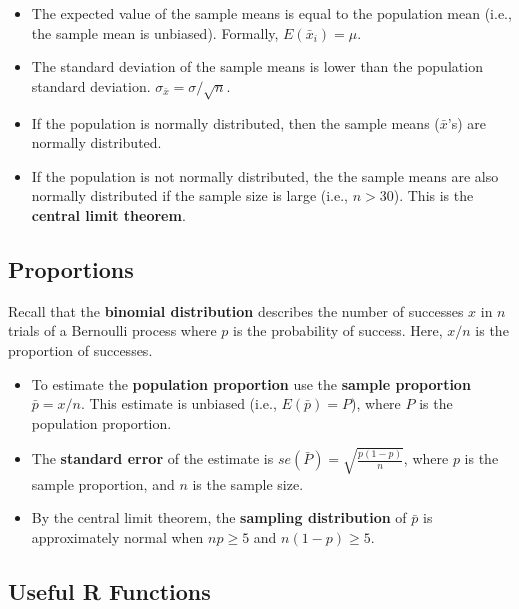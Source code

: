 \documentclass[
  letterpaper,
  DIV=11,
  numbers=noendperiod]{scrreprt}
\begin{document}
\begin{itemize}
\item
  The expected value of the sample means is equal to the population mean
  (i.e., the sample mean is unbiased). Formally, \(E(\bar x_i) = \mu\).
\item
  The standard deviation of the sample means is lower than the
  population standard deviation. \(\sigma_{\bar x}= \sigma/\sqrt{n}\).
\item
  If the population is normally distributed, then the sample means
  (\(\bar x\)'s) are normally distributed.
\item
  If the population is not normally distributed, the the sample means
  are also normally distributed if the sample size is large (i.e.,
  \(n>30\)). This is the \textbf{central limit theorem}.
\end{itemize}

\hypertarget{proportions}{%
\subsection*{Proportions}\label{proportions}}

Recall that the \textbf{binomial distribution} describes the number of
successes \(x\) in \(n\) trials of a Bernoulli process where \(p\) is
the probability of success. Here, \(x/n\) is the proportion of
successes.

\begin{itemize}
\item
  To estimate the \textbf{population proportion} use the \textbf{sample
  proportion} \(\bar p = x/n\). This estimate is unbiased (i.e.,
  \(E(\bar p)=P\)), where \(P\) is the population proportion.
\item
  The \textbf{standard error} of the estimate is
  \(se(\bar P)= \sqrt { \frac {p(1-p)}{n}}\), where \(p\) is the sample
  proportion, and \(n\) is the sample size.
\item
  By the central limit theorem, the \textbf{sampling distribution} of
  \(\bar p\) is approximately normal when \(np \geq 5\) and
  \(n(1-p)\geq 5\).
\end{itemize}

\hypertarget{useful-r-functions-10}{%
\subsection*{Useful R Functions}\label{useful-r-functions-10}}
\end{document}

